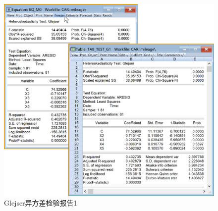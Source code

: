 \documentclass[12pt,(landscape,a4paper),(portrait,a4paper)]{article}
\begin{document}
\begin{figure}

{\centering \includegraphics[width=28.83in]{picture/lab6-heteroskedasticity/4-test-G1-2} 

}

\caption{Glejser异方差检验报告1}\label{fig:fig-G1-report}
\end{figure}
\end{document}
